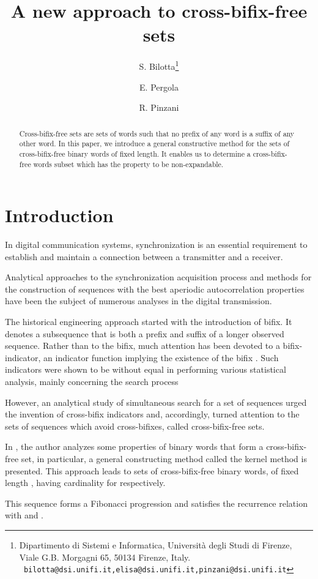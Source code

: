 \documentclass[a4paper,11pt]{article}
\date{}
\author{S. Bilotta\thanks{Dipartimento di Sistemi e Informatica, Universit\`a degli Studi di Firenze, Viale
 G.B. Morgagni 65, 50134 Firenze, Italy. {\newline
 \tt \ bilotta@dsi.unifi.it,\quad elisa@dsi.unifi.it,\quad pinzani@dsi.unifi.it}} \and E. Pergola\and R. Pinzani}
\title{A new approach to cross-bifix-free sets}
\begin{document}
\maketitle

\begin{abstract}
Cross-bifix-free sets are sets of words such that no prefix of any
word is a suffix of any other word. In this paper, we introduce a
general constructive method for the sets of cross-bifix-free
binary words of fixed length. It enables us to determine a
cross-bifix-free words subset which has the property to be
non-expandable.
\end{abstract}

\section{Introduction}

In digital communication systems, synchronization is an essential
requirement to establish and maintain a connection between a
transmitter and a receiver.


Analytical approaches to the synchronization acquisition process
and methods for the construction of sequences with the best
aperiodic autocorrelation properties have been the subject of
numerous analyses in the digital transmission.

The historical engineering approach started with the introduction
of bifix. It denotes a subsequence that is both a prefix and
suffix of a longer observed sequence. Rather than to the bifix,
much attention has been devoted to a bifix-indicator, an indicator
function implying the existence of the bifix \cite{10}. Such
indicators were shown to be without equal in performing various
statistical analysis, mainly concerning the search process
\cite{3,10}

However, an analytical study of simultaneous search for a set of
sequences urged the invention of cross-bifix indicators \cite{1,2}
and, accordingly, turned attention to the sets of sequences which
avoid cross-bifixes, called cross-bifix-free sets.

In \cite{1}, the author analyzes some properties of binary words
that form a cross-bifix-free set, in particular, a general
constructing method called the kernel method is presented. This
approach leads to sets  of cross-bifix-free binary words, of
fixed length , having cardinality
 for
 respectively.

This sequence forms a Fibonacci progression and satisfies the
recurrence relation  with  and
.
\end{document}
